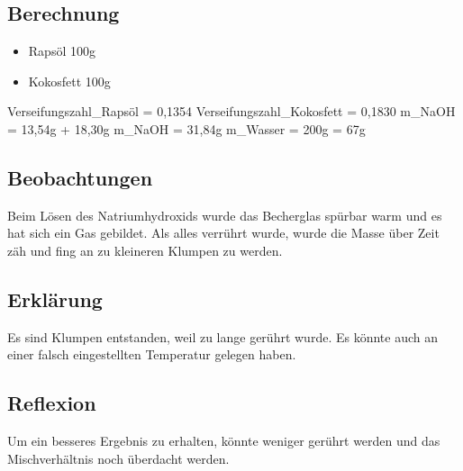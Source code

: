 \documentclass{article}
\begin{document}
    \subsection{Berechnung}
    \begin{itemize}
        \item  Rapsöl 100g
        \item Kokosfett 100g
    \end{itemize}
    Verseifungszahl_{Rapsöl} = 0,1354
    \linebreak
    Verseifungszahl_{Kokosfett} = 0,1830
    \linebreak
    m_{NaOH} = 13,54g + 18,30g
    \linebreak
    m_{NaOH} =  31,84g
    \linebreak
    m_{Wasser} =  \cdot 200g = 67g

    \subsection{Beobachtungen}
    Beim Lösen des Natriumhydroxids wurde das Becherglas spürbar warm und es hat sich ein Gas gebildet.
    Als alles verrührt wurde, wurde die Masse über Zeit zäh und fing an zu kleineren Klumpen zu werden.


    \subsection{Erklärung}
    Es sind Klumpen entstanden, weil zu lange gerührt wurde.
    Es könnte auch an einer falsch eingestellten Temperatur gelegen haben.

    \subsection{Reflexion}
    Um ein besseres Ergebnis zu erhalten, könnte weniger gerührt werden und das Mischverhältnis noch überdacht werden.
\end{document}
